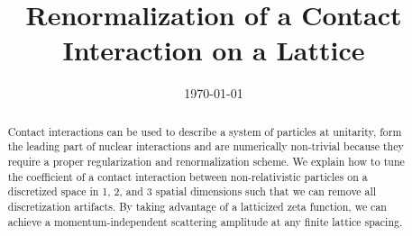 \documentclass[aps,superscriptaddress,tightenlines,nofootinbib,floatfix,longbibliography,notitlepage]{revtex4-1}
\begin{document}
\title{Renormalization of a Contact Interaction on a Lattice}





\date{\today}

\begin{abstract}
Contact interactions can be used to describe a system of particles at unitarity, form the leading part of nuclear interactions and are numerically non-trivial because they require a proper regularization and renormalization scheme.
We explain how to tune the coefficient of a contact interaction between non-relativistic particles on a discretized space in 1, 2, and 3 spatial dimensions such that we can remove all discretization artifacts.
By taking advantage of a latticized \Luscher zeta function, we can achieve a momentum-independent scattering amplitude at any finite lattice spacing.
\end{abstract}

\maketitle





    \FloatBarrier
       \FloatBarrier
      \FloatBarrier
% 



\appendix






\end{document}
